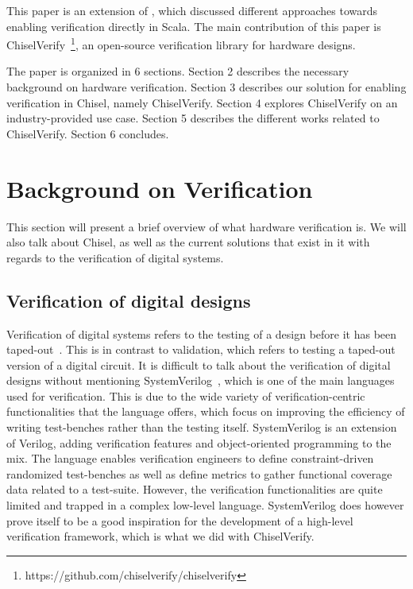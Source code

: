 \documentclass[conference]{IEEEtran}
\begin{document}
This paper is an extension of \cite{verify:chisel:2020}, which discussed different approaches towards enabling verification directly in Scala.
The main contribution of this paper is ChiselVerify~\footnote{https://github.com/chiselverify/chiselverify}, an open-source verification library for hardware designs.

The paper is organized in 6 sections.
Section 2 describes the necessary background on hardware verification.
Section 3 describes our solution for enabling verification in Chisel, namely ChiselVerify.
Section 4 explores ChiselVerify on an industry-provided use case.
Section 5 describes the different works related to ChiselVerify.
Section 6 concludes.


\section{Background on Verification}
\label{sec:background}

This section will present a brief overview of what hardware verification is. We will also talk about Chisel, as well as the current solutions that exist in it with regards to the verification of digital systems.

\subsection{Verification of digital designs}
Verification of digital systems refers to the testing of a design before it has been taped-out~\cite{spear2008systemverilog}. This is in contrast to validation, which refers to testing a taped-out version of a digital circuit. 
It is difficult to talk about the verification of digital designs without mentioning SystemVerilog~\cite{SystemVerilog}, which is one of the main languages used for verification.
This is due to the wide variety of verification-centric functionalities that the language offers, which focus on improving the efficiency of writing test-benches rather than the testing itself.
SystemVerilog is an extension of Verilog, adding verification features and object-oriented programming to the mix. 
The language enables verification engineers to define constraint-driven randomized test-benches as well as define metrics to gather functional coverage data related to a test-suite. 
However, the verification functionalities are quite limited and trapped in a complex low-level language. 
SystemVerilog does however prove itself to be a good inspiration for the development of a high-level verification framework, which is what we did with ChiselVerify.
\end{document}
